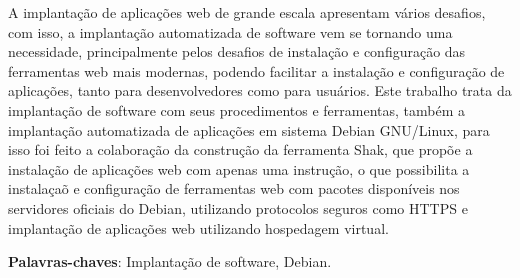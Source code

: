 \begin{resumo}

A implantação de aplicações web de grande escala apresentam vários desafios, com
isso, a implantação automatizada de software vem se tornando uma necessidade,
principalmente pelos desafios de instalação e configuração das ferramentas web
mais modernas, podendo facilitar a instalação e configuração de aplicações, tanto para
desenvolvedores como para usuários. Este trabalho trata da implantação de software
com seus procedimentos e ferramentas, também a implantação  automatizada de
aplicações em sistema Debian GNU/Linux, para isso foi feito a colaboração da
construção da ferramenta Shak, que propõe a instalação de aplicações web com
apenas uma instrução, o que possibilita a instalaçaõ e configuração de ferramentas
web com pacotes disponíveis nos servidores oficiais do Debian, utilizando
protocolos seguros como HTTPS e implantação de aplicações web utilizando hospedagem virtual.
 \vspace{\onelineskip}

 \noindent
 \textbf{Palavras-chaves}: Implantação de software, Debian.
\end{resumo}
